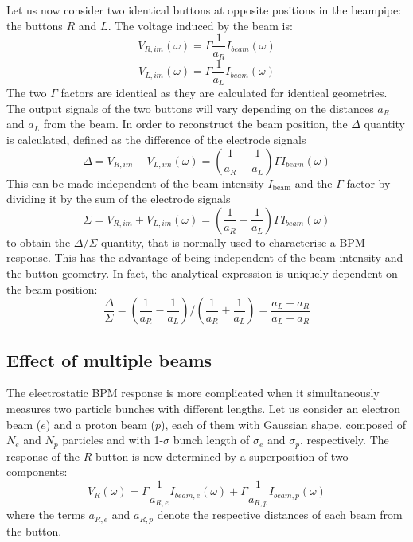 Let us now consider two identical buttons at opposite positions in the beampipe: the buttons $R$ and $L$. The voltage induced by the beam is:
\begin{equation}
V_{R,im}(\omega) = \Gamma \frac{1}{a_R} I_{beam}(\omega)
\end{equation}
\begin{equation}
V_{L,im}(\omega) = \Gamma \frac{1}{a_L} I_{beam}(\omega)
\end{equation}
The two $\Gamma$ factors are identical as they are calculated for identical geometries. The output signals of the two buttons will vary depending on the distances $a_R$ and $a_L$ from the beam. In order to reconstruct the beam position, the $\Delta$ quantity is calculated, defined as the difference of the electrode signals
\begin{equation}
\Delta = V_{R,im} - V_{L,im}(\omega) = \left( \frac{1}{a_R} - \frac{1}{a_L}  \right) \Gamma I_{beam}(\omega)
\end{equation}
This can be made independent of the beam intensity $I_\text{beam}$ and the $\Gamma$ factor by dividing it by the sum of the electrode signals
\begin{equation}
\Sigma = V_{R,im} + V_{L,im}(\omega) = \left( \frac{1}{a_R} + \frac{1}{a_L}  \right) \Gamma I_{beam}(\omega)
\end{equation}
to obtain the $\Delta/\Sigma$ quantity, that is normally used to characterise a BPM response. This has the advantage of being independent of the beam intensity and the button geometry. In fact, the analytical expression is uniquely dependent on the beam position:
\begin{equation}
\frac{\Delta}{\Sigma} = \left( \frac{1}{a_R} - \frac{1}{a_L}  \right) / \left( \frac{1}{a_R} + \frac{1}{a_L}  \right) = \frac{a_L - a_R}{a_L + a_R}\label{eq:delta_sigma}
\end{equation}



\subsection[Effect of multiple beams]{Effect of multiple beams}

The electrostatic BPM response is more complicated when it simultaneously measures two particle bunches with different lengths. Let us consider an electron beam ($e$) and a proton beam ($p$), each of them with Gaussian shape, composed of $N_e$ and $N_p$ particles and with 1-$\sigma$ bunch length of $\sigma_e$ and $\sigma_p$, respectively. The response of the $R$ button is now determined by a superposition of two components:
\begin{equation}
V_{R}(\omega) = \Gamma \frac{1}{a_{R,e}} I_{beam, e}(\omega) +  \Gamma \frac{1}{a_{R,p}} I_{beam, p}(\omega)
\end{equation}
where the terms $a_{R,e}$ and $a_{R,p}$ denote the respective distances of each beam from the button.

